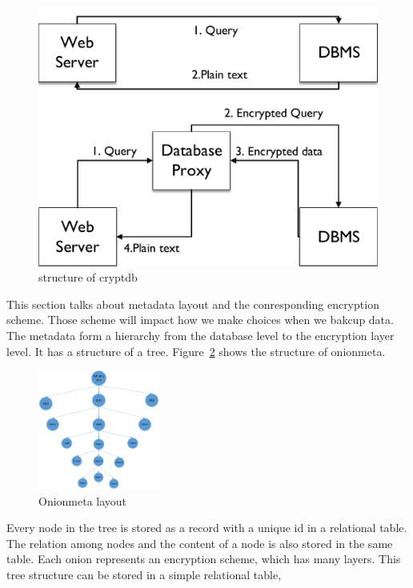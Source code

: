 \begin{figure}[tb]
\centering
\includegraphics[width=\columnwidth]{images/Cryptdb-structure.pdf}
\caption{structure of cryptdb}
\label{fig:stack1}
\end{figure}




This section talks about metadata layout and the conresponding encryption scheme. Those scheme will impact how we make choices when we bakcup data. The metadata form a hierarchy from the database level to the encryption layer level. It has a structure of a tree. Figure~\ref{fig:stack2} shows the structure of onionmeta.


\begin{figure}[tb]
\centering
\includegraphics[width=4cm]{images/layers.png}
\caption{Onionmeta layout}
\label{fig:stack2}
\end{figure}

Every node in the tree is stored as a record with a unique id in a relational table. The relation among nodes and the content of a node is also stored in the same table. Each onion represents an encryption scheme, which has many layers. This tree structure can be stored in a simple relational table, 

